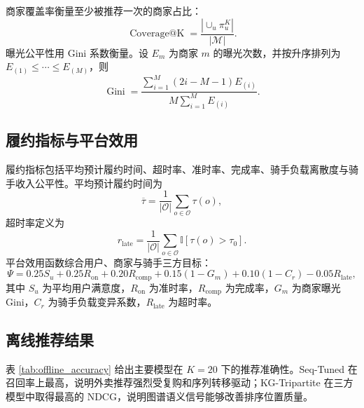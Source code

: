 \documentclass[12pt,a4paper]{article}
\begin{document}
    商家覆盖率衡量至少被推荐一次的商家占比：
    \begin{equation}
        \operatorname{Coverage@K}=\frac{|\cup_{u}\pi_u^K|}{|\mathcal{M}|}.
    \end{equation}
    曝光公平性用 Gini 系数衡量。设 $E_m$ 为商家 $m$ 的曝光次数，并按升序排列为 $E_{(1)}\le\cdots\le E_{(M)}$，则
    \begin{equation}
        \operatorname{Gini}=\frac{\sum_{i=1}^{M}(2i-M-1)E_{(i)}}{M\sum_{i=1}^{M}E_{(i)}}.
    \end{equation}

    \subsection{履约指标与平台效用}

    履约指标包括平均预计履约时间、超时率、准时率、完成率、骑手负载离散度与骑手收入公平性。平均预计履约时间为
    \begin{equation}
        \overline{\tau}=\frac{1}{|\mathcal{O}|}\sum_{o\in\mathcal{O}}\tau(o),
    \end{equation}
    超时率定义为
    \begin{equation}
        r_{\mathrm{late}}=\frac{1}{|\mathcal{O}|}\sum_{o\in\mathcal{O}}\mathbb{I}[\tau(o)>\tau_0].
    \end{equation}
    平台效用函数综合用户、商家与骑手三方目标：
    \begin{equation}
        \Psi=0.25S_u+0.25R_{\mathrm{on}}+0.20R_{\mathrm{comp}}+0.15(1-G_m)+0.10(1-C_r)-0.05R_{\mathrm{late}},
    \end{equation}
    其中 $S_u$ 为平均用户满意度，$R_{\mathrm{on}}$ 为准时率，$R_{\mathrm{comp}}$ 为完成率，$G_m$ 为商家曝光 Gini，$C_r$ 为骑手负载变异系数，$R_{\mathrm{late}}$ 为超时率。

    \subsection{离线推荐结果}

    表 \ref{tab:offline_accuracy} 给出主要模型在 $K=20$ 下的推荐准确性。Seq-Tuned 在召回率上最高，说明外卖推荐强烈受复购和序列转移驱动；KG-Tripartite 在三方模型中取得最高的 NDCG，说明图谱语义信号能够改善排序位置质量。
\end{document}
